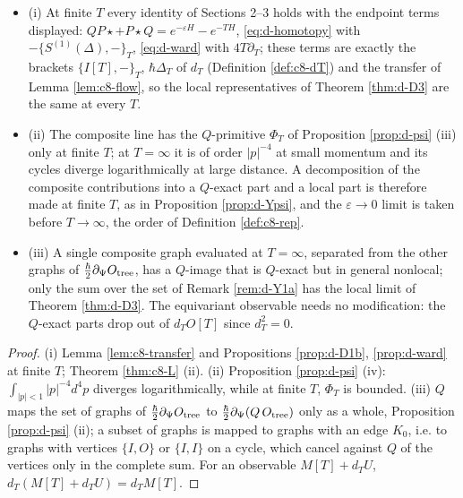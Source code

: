 \begin{proposition}
\label{prop:d-T}
\begin{itemize}
\item (i) At finite $T$ every identity of Sections 2--3 holds with the endpoint terms displayed: $QP\star+P\star Q=e^{-\varepsilon H}-e^{-TH}$, \eqref{eq:d-homotopy} with $-\{S^{(1)}(\Delta),-\}_T$, \eqref{eq:d-ward} with $4T\partial_T$; these terms are exactly the brackets $\{I[T],-\}_T$, $\hbar\Delta_T$ of $d_T$ (Definition \ref{def:c8-dT}) and the transfer of Lemma \ref{lem:c8-flow}, so the local representatives of Theorem \ref{thm:d-D3} are the same at every $T$.
\item (ii) The composite line has the $Q$-primitive $\Phi_T$ of Proposition \ref{prop:d-psi} (iii) only at finite $T$; at $T=\infty$ it is of order $|p|^{-4}$ at small momentum and its cycles diverge logarithmically at large distance. A decomposition of the composite contributions into a $Q$-exact part and a local part is therefore made at finite $T$, as in Proposition \ref{prop:d-Ypsi}, and the $\varepsilon\to0$ limit is taken before $T\to\infty$, the order of Definition \ref{def:c8-rep}.
\item (iii) A single composite graph evaluated at $T=\infty$, separated from the other graphs of $\tfrac\hbar2\partial_\Psi O_{\rm tree}$, has a $Q$-image that is $Q$-exact but in general nonlocal; only the sum over the set of Remark \ref{rem:d-Y1a} has the local limit of Theorem \ref{thm:d-D3}. The equivariant observable needs no modification: the $Q$-exact parts drop out of $d_TO[T]$ since $d_T^2=0$.
\end{itemize}
\end{proposition}

\begin{proof}
(i) Lemma \ref{lem:c8-transfer} and Propositions \ref{prop:d-D1b}, \ref{prop:d-ward} at finite $T$; Theorem \ref{thm:c8-L} (ii). (ii) Proposition \ref{prop:d-psi} (iv): $\int_{|p|<1}|p|^{-4}d^4p$ diverges logarithmically, while at finite $T$, $\Phi_T$ is bounded. (iii) $Q$ maps the set of graphs of $\tfrac\hbar2\partial_\Psi O_{\rm tree}$ to $\tfrac\hbar2\partial_\Psi(Q\,O_{\rm tree})$ only as a whole, Proposition \ref{prop:d-psi} (ii); a subset of graphs is mapped to graphs with an edge $K_0$, i.e. to graphs with vertices $\{I,O\}$ or $\{I,I\}$ on a cycle, which cancel against $Q$ of the vertices only in the complete sum. For an observable $M[T]+d_TU$, $d_T(M[T]+d_TU)=d_TM[T]$.
\end{proof}

